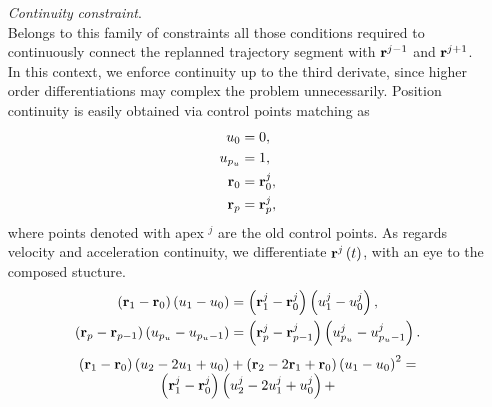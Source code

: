 \begin{itemize}
    \item[\emph{Continuity}]\emph{constraint}.\\
    Belongs to this family of constraints all those conditions required to continuously connect the replanned trajectory segment with
    $\mathbf{r}^{j-1}$ and $\mathbf{r}^{j+1}$. In this context, we enforce continuity up to the third derivate, since higher order differentiations
    may complex the problem unnecessarily. Position continuity is easily obtained via control points matching as
    \begin{equation*}
        \begin{split}
            u_0 & = 0, \\
            u_{p_{u}} & = 1, \\
            \mathbf{r}_0 & = \mathbf{r}_0^j, \\
            \mathbf{r}_{p} & = \mathbf{r}_{p}^j, \\
        \end{split}
    \end{equation*}
    where points denoted with apex $^j$ are the old control points.
    As regards velocity and acceleration continuity, we differentiate $\mathbf{r}^j \left( t \right)$, with an eye to the composed stucture.
    \begin{equation*}
        \begin{split}
            \left( \mathbf{r}_1 - \mathbf{r}_0 \right)
            \left( u_1 - u_0 \right) & =
            \left( \mathbf{r}^j_1 - \mathbf{r}^j_0 \right)
            \left( u_1^j - u_0^j \right), \\
            \left( \mathbf{r}_{p} - \mathbf{r}_{p-1} \right)
            \left( u_{p_{u}} - u_{p_{u}-1} \right) & =
            \left( \mathbf{r}^j_{p} - \mathbf{r}^j_{p-1} \right)
            \left( u_{p_{u}}^j - u_{p_{u}-1}^j \right).
        \end{split}
    \end{equation*}
    \begin{equation*}
        \begin{matrix}
            \begin{matrix}
                \left( \mathbf{r}_1 - \mathbf{r}_0 \right) \left( u_2 - 2u_1 + u_0 \right) +
                \left( \mathbf{r}_2 - 2\mathbf{r}_1 + \mathbf{r}_0 \right) \left( u_1 - u_0 \right)^2 = \\
                \left( \mathbf{r}_1^j - \mathbf{r}_0^j \right) \left( u_2^j - 2u_1^j + u_0^j \right) +

\end{matrix}
\end{matrix}
\end{equation*}
\end{itemize}
